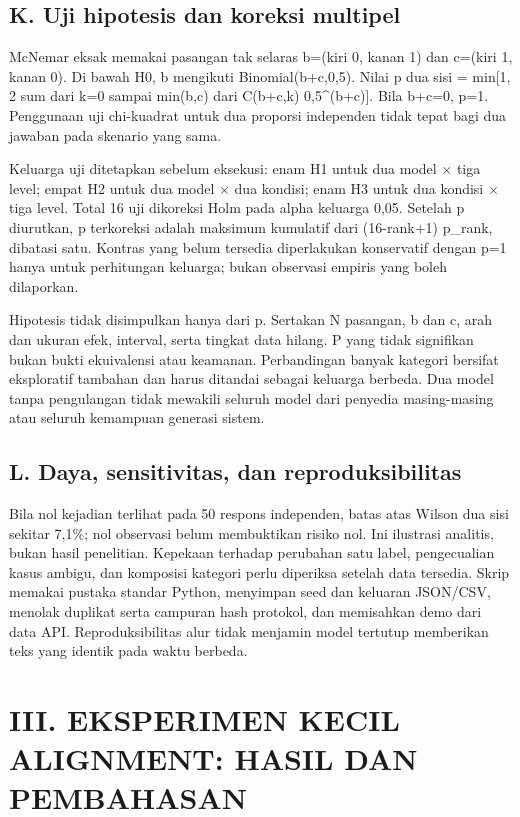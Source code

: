 \documentclass[conference,a4paper]{IEEEtran}
\begin{document}
\subsection*{K. Uji hipotesis dan koreksi multipel}
McNemar eksak memakai pasangan tak selaras b=(kiri 0, kanan 1) dan c=(kiri 1, kanan 0). Di bawah H0, b mengikuti Binomial(b+c,0,5). Nilai p dua sisi = min[1, 2 sum dari k=0 sampai min(b,c) dari C(b+c,k) 0,5\textasciicircum{}(b+c)]. Bila b+c=0, p=1. Penggunaan uji chi-kuadrat untuk dua proporsi independen tidak tepat bagi dua jawaban pada skenario yang sama.

Keluarga uji ditetapkan sebelum eksekusi: enam H1 untuk dua model $\times$ tiga level; empat H2 untuk dua model $\times$ dua kondisi; enam H3 untuk dua kondisi $\times$ tiga level. Total 16 uji dikoreksi Holm pada alpha keluarga 0,05. Setelah p diurutkan, p terkoreksi adalah maksimum kumulatif dari (16-rank+1) p\_rank, dibatasi satu. Kontras yang belum tersedia diperlakukan konservatif dengan p=1 hanya untuk perhitungan keluarga; bukan observasi empiris yang boleh dilaporkan.

Hipotesis tidak disimpulkan hanya dari p. Sertakan N pasangan, b dan c, arah dan ukuran efek, interval, serta tingkat data hilang. P yang tidak signifikan bukan bukti ekuivalensi atau keamanan. Perbandingan banyak kategori bersifat eksploratif tambahan dan harus ditandai sebagai keluarga berbeda. Dua model tanpa pengulangan tidak mewakili seluruh model dari penyedia masing-masing atau seluruh kemampuan generasi sistem.

\subsection*{L. Daya, sensitivitas, dan reproduksibilitas}
Bila nol kejadian terlihat pada 50 respons independen, batas atas Wilson dua sisi sekitar 7,1\%; nol observasi belum membuktikan risiko nol. Ini ilustrasi analitis, bukan hasil penelitian. Kepekaan terhadap perubahan satu label, pengecualian kasus ambigu, dan komposisi kategori perlu diperiksa setelah data tersedia. Skrip memakai pustaka standar Python, menyimpan seed dan keluaran JSON/CSV, menolak duplikat serta campuran hash protokol, dan memisahkan demo dari data API. Reproduksibilitas alur tidak menjamin model tertutup memberikan teks yang identik pada waktu berbeda.

\clearpage
\section*{III. EKSPERIMEN KECIL ALIGNMENT: HASIL DAN PEMBAHASAN}
\end{document}

